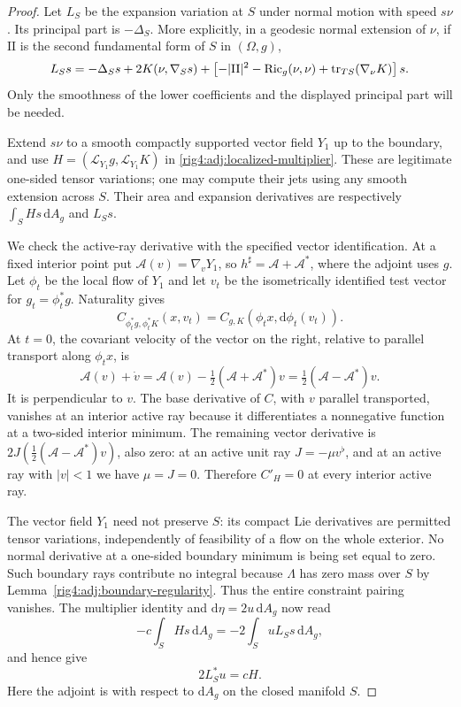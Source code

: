 \begin{proof}
Let $L_S$ be the expansion variation at $S$ under normal motion with speed
$s\nu$.  Its principal part is $-\Delta_S$.  More explicitly, in a geodesic
normal extension of $\nu$, if $\mathrm{II}$ is the second fundamental form
of $S$ in $(\Omega,g)$,
\[
 L_Ss=-\Delta_Ss+2K(\nu,\nabla_Ss)
  +\left[-|\mathrm{II}|^2-\operatorname{Ric}_g(\nu,\nu)
          +\operatorname{tr}_{TS}(\nabla_\nu K)\right]s.
\]
Only the smoothness of the lower coefficients and the displayed principal
part will be needed.

Extend $s\nu$ to a smooth compactly supported vector field $Y_1$ up to the
boundary, and use $H=(\mathcal L_{Y_1}g,\mathcal L_{Y_1}K)$ in
\eqref{rig4:adj:localized-multiplier}.  These are legitimate one-sided tensor
variations; one may compute their jets using any smooth extension across
$S$.  Their area and expansion derivatives are respectively
$\int_SHs\,\mathrm dA_g$ and $L_Ss$.

We check the active-ray derivative with the specified vector identification.
At a fixed interior point put $\mathcal A(v)=\nabla_vY_1$, so
$h^\sharp=\mathcal A+\mathcal A^*$, where the adjoint uses $g$.
Let $\phi_t$ be the local flow of $Y_1$ and let $v_t$ be the isometrically
identified test vector for $g_t=\phi_t^*g$.  Naturality gives
\[
 C_{\phi_t^*g,\phi_t^*K}(x,v_t)
   =C_{g,K}(\phi_t x,\mathrm d\phi_t(v_t)).
\]
At $t=0$, the covariant velocity of the vector on the right, relative to
parallel transport along $\phi_t x$, is
\[
 \mathcal A(v)+\dot v
 =\mathcal A(v)-\tfrac12(\mathcal A+\mathcal A^*)v
 =\tfrac12(\mathcal A-\mathcal A^*)v.
\]
It is perpendicular to $v$.  The base derivative of $C$, with $v$ parallel
transported, vanishes at an interior active ray because it differentiates
a nonnegative function at a two-sided interior minimum.  The remaining
vector derivative is $2J(\tfrac12(\mathcal A-\mathcal A^*)v)$, also zero:
at an active unit ray $J=-\mu v^\flat$, and at an active ray with $|v|<1$
we have $\mu=J=0$.  Therefore $C'_H=0$ at every interior active ray.

The vector field $Y_1$ need not preserve $S$: its compact Lie derivatives
are permitted tensor variations, independently of feasibility of a flow on
the whole exterior.  No normal derivative at a one-sided boundary minimum
is being set equal to zero.  Such boundary rays contribute no integral
because $\Lambda$ has zero mass over $S$ by
Lemma~\ref{rig4:adj:boundary-regularity}.  Thus the entire constraint pairing
vanishes.  The multiplier identity and $\mathrm d\eta=2u\,\mathrm dA_g$
now read
\[
 -c\int_S Hs\,\mathrm dA_g=-2\int_SuL_Ss\,\mathrm dA_g,
\]
and hence give
\begin{equation}
 2L_S^*u=cH.
 \label{rig4:adj:boundary-stability-adjoint}
\end{equation}
Here the adjoint is with respect to $\mathrm dA_g$ on the closed manifold
$S$.


\end{proof}
